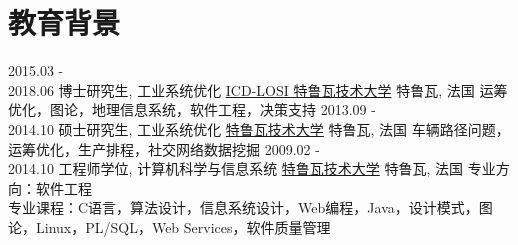 \documentclass[letterpaper]{twentysecondcv} %
\begin{document}
\makeprofile %


\vspace{-0.2cm}
\section{教育背景}

\begin{twenty}
	\twentyitem
    	{2015.03 - \\ 2018.06}
        {博士研究生, 工业系统优化}
        {\href{http://losi.utt.fr/en/index.html}{ICD-LOSI 特鲁瓦技术大学}}
        {特鲁瓦, 法国}
        {\textbullet{} 运筹优化，图论，地理信息系统，软件工程，决策支持}
	\twentyitem
    	{2013.09 - \\ 2014.10}
        {硕士研究生, 工业系统优化}
        {\href{http://www.utt.fr/en/index.html}{特鲁瓦技术大学}}
        {特鲁瓦, 法国}
        {\textbullet{} 车辆路径问题，运筹优化，生产排程，社交网络数据挖掘}
    \twentyitem
    	{2009.02 - \\ 2014.10}
        {工程师学位, 计算机科学与信息系统}
        {\href{http://www.utt.fr/en/index.html}{特鲁瓦技术大学}}
        {特鲁瓦, 法国}
        {\textbullet{} 专业方向：软件工程 \\
        \textbullet{} 专业课程：C语言，算法设计，信息系统设计，Web编程，Java，设计模式，图论，Linux，PL/SQL，Web Services，软件质量管理\vspace{0.3cm}}
\end{twenty}
\end{document}
